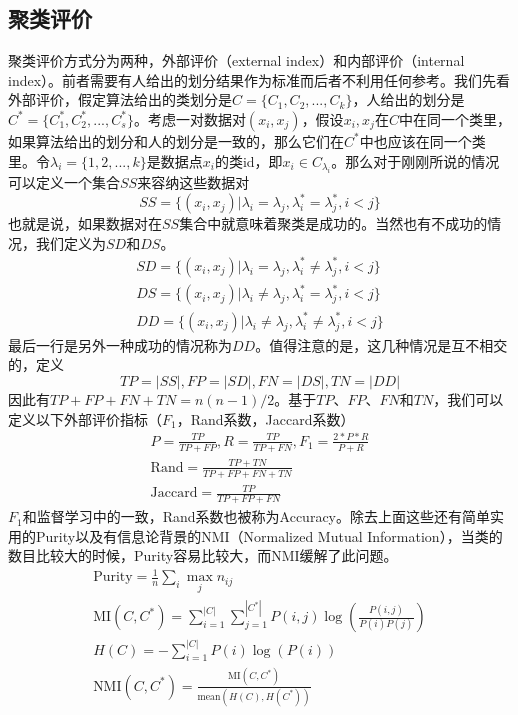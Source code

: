\subsection{聚类评价}
聚类评价方式分为两种，外部评价（external index）和内部评价（internal index）。前者需要有人给出的划分结果作为标准而后者不利用任何参考。我们先看外部评价，假定算法给出的类划分是$C=\{C_1, C_2,...,C_k\}$，人给出的划分是$C^* = \{C_1^*,C_2^*,...,C_s^*\}$。考虑一对数据对$(x_i,x_j)$，假设$x_i,x_j$在$C$中在同一个类里，如果算法给出的划分和人的划分是一致的，那么它们在$C^*$中也应该在同一个类里。令$\lambda_i = \{1,2,...,k\}$是数据点$x_i$的类id，即$x_i \in C_{\lambda_i}$。那么对于刚刚所说的情况可以定义一个集合$SS$来容纳这些数据对
\begin{equation}
    SS = \{(x_i,x_j)|\lambda_i = \lambda_j,\lambda_i^* = \lambda_j^*, i<j \}
\end{equation}
也就是说，如果数据对在$SS$集合中就意味着聚类是成功的。当然也有不成功的情况，我们定义为$SD$和$DS$。
\begin{gather}
    SD = \{(x_i,x_j)|\lambda_i = \lambda_j,\lambda_i^* \neq \lambda_j^*, i<j \} \\
    DS = \{(x_i,x_j)|\lambda_i \neq \lambda_j,\lambda_i^* = \lambda_j^*, i<j \} \\
    DD = \{(x_i,x_j)|\lambda_i \neq \lambda_j,\lambda_i^* \neq \lambda_j^*, i<j \}
\end{gather}
最后一行是另外一种成功的情况称为$DD$。值得注意的是，这几种情况是互不相交的，定义
\begin{equation}
    TP = |SS|, FP = |SD|, FN = |DS|, TN = |DD|
\end{equation}
因此有$TP+FP+FN+TN=n(n-1)/2$。基于$TP$、$FP$、$FN$和$TN$，我们可以定义以下外部评价指标（$F_1$，Rand系数，Jaccard系数）
\begin{gather}
    P = \frac{TP}{TP+FP},R = \frac{TP}{TP+FN}, F_1 = \frac{2*P*R}{P+R} \\
    \text{Rand} = \frac{TP+TN}{TP+FP+FN+TN} \\ 
    \text{Jaccard} = \frac{TP}{TP+FP+FN}
\end{gather}
$F_1$和监督学习中的一致，Rand系数也被称为Accuracy。除去上面这些还有简单实用的Purity以及有信息论背景的NMI（Normalized Mutual Information），当类的数目比较大的时候，Purity容易比较大，而NMI缓解了此问题。
\begin{gather}
    \text{Purity} = \frac{1}{n} \sum_i \max_j n_{ij} \\
    \text{MI}(C, C^*) = \sum_{i=1}^{|C|}\sum_{j=1}^{|C^*|}P(i, j)\log\left(\frac{P(i,j)}{P(i)P(j)}\right) \\
    H(C) = - \sum_{i=1}^{|C|}P(i)\log(P(i)) \\
    \text{NMI}(C, C^*) = \frac{\text{MI}(C, C^*)}{\text{mean}(H(C), H(C^*))}
\end{gather}

